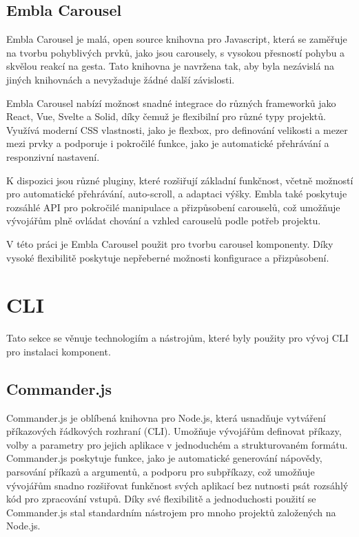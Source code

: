 \subsection{Embla Carousel}
Embla Carousel je malá, open source knihovna pro Javascript, která se zaměřuje na tvorbu pohyblivých prvků, jako jsou carousely, s vysokou přesností pohybu a skvělou reakcí na gesta. Tato knihovna je navržena tak, aby byla nezávislá na jiných knihovnách a nevyžaduje žádné další závislosti. \cite{EmblaCarousel}

Embla Carousel nabízí možnost snadné integrace do různých frameworků jako React, Vue, Svelte a Solid, díky čemuž je flexibilní pro různé typy projektů. Využívá moderní CSS vlastnosti, jako je flexbox, pro definování velikosti a mezer mezi prvky a podporuje i pokročilé funkce, jako je automatické přehrávání a responzivní nastavení.

K dispozici jsou různé pluginy, které rozšiřují základní funkčnost, včetně možností pro automatické přehrávání, auto-scroll, a adaptaci výšky. Embla také poskytuje rozsáhlé API pro pokročilé manipulace a přizpůsobení carouselů, což umožňuje vývojářům plně ovládat chování a vzhled carouselů podle potřeb projektu.

V této práci je Embla Carousel použit pro tvorbu carousel komponenty. Díky vysoké flexibilitě poskytuje nepřeberné možnosti konfigurace a přizpůsobení.

\section{CLI}
Tato sekce se věnuje technologiím a nástrojům, které byly použity pro vývoj CLI pro instalaci komponent.

\subsection{Commander.js}
Commander.js je oblíbená knihovna pro Node.js, která usnadňuje vytváření příkazových řádkových rozhraní (CLI). Umožňuje vývojářům definovat příkazy, volby a parametry pro jejich aplikace v jednoduchém a strukturovaném formátu. Commander.js poskytuje funkce, jako je automatické generování nápovědy, parsování příkazů a argumentů, a podporu pro subpříkazy, což umožňuje vývojářům snadno rozšiřovat funkčnost svých aplikací bez nutnosti psát rozsáhlý kód pro zpracování vstupů. Díky své flexibilitě a jednoduchosti použití se Commander.js stal standardním nástrojem pro mnoho projektů založených na Node.js. \cite{CommanderJS}


